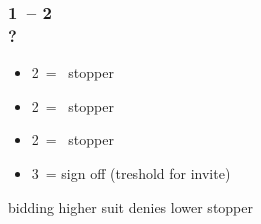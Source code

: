 \documentclass[12pt, a4paper]{article}
\begin{document}
\subsubsection*{1\diams\ -- 2\diams \\ ?}
\begin{itemize}
    \item 2\hearts\ = \hearts\ stopper
    \item 2\spades\ = \spades\ stopper
    \item 2\nt\ = \clubs\ stopper
    \item 3\clubs\ = sign off (treshold for invite)
\end{itemize}

bidding higher suit denies lower stopper

\end{document}
